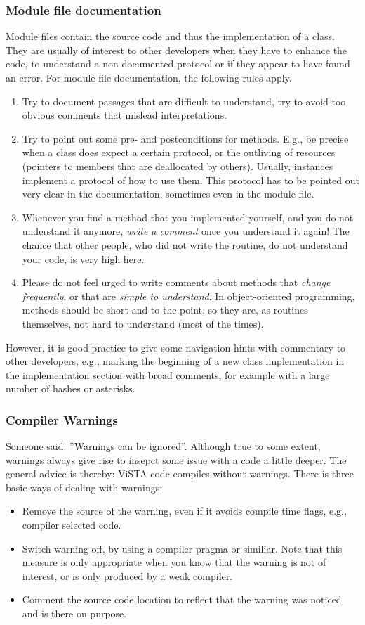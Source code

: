\subsubsection{Module file documentation}
Module files contain the source code and thus the implementation of a class. They are usually of interest to other developers when they have to enhance the code, to understand a non documented protocol or if they appear to have found an error.
For module file documentation, the following rules apply.
\begin{enumerate}
\item Try to document passages that are difficult to understand, try to avoid too obvious comments that mislead interpretations.
\item Try to point out some pre- and postconditions for methods. 
E.g., be precise when a class does expect a certain protocol, or the outliving of resources (pointers to members that are deallocated by others).
Usually, instances implement a protocol of how to use them.
This protocol has to be pointed out very clear in the documentation, sometimes even in the module file.
\item Whenever you find a method that you implemented yourself, and you do not understand it anymore, \emph{write a comment} once you understand it again!
The chance that other people, who did not write the routine, do not understand your code, is very high here.
\item Please do not feel urged to write comments about methods that \emph{change frequently}, or that are \emph{simple to understand}.
In object-oriented programming, methods should be short and to the point, so they are, as routines themselves, not hard to understand (most of the times).
\end{enumerate}
However, it is good practice to give some navigation hints with commentary to other developers, e.g., marking the beginning of a new class implementation in the implementation section with broad comments, for example with a large number of hashes or asterisks.

\subsubsection{Compiler Warnings}
Someone said: ''Warnings can be ignored''.
Although true to some extent, warnings always give rise to insepct some issue with a code a little deeper.
The general advice is thereby: ViSTA code compiles without warnings.
There is three basic ways of dealing with warnings:
\begin{itemize}
\item Remove the source of the warning, even if it avoids compile time flags, e.g., compiler selected code.
\item Switch warning off, by using a compiler pragma or similiar.
	Note that this measure is only appropriate when you know that the warning is not of interest, or is only produced by a weak compiler.
\item Comment the source code location to reflect that the warning was noticed and is there on purpose.
\end{itemize}

